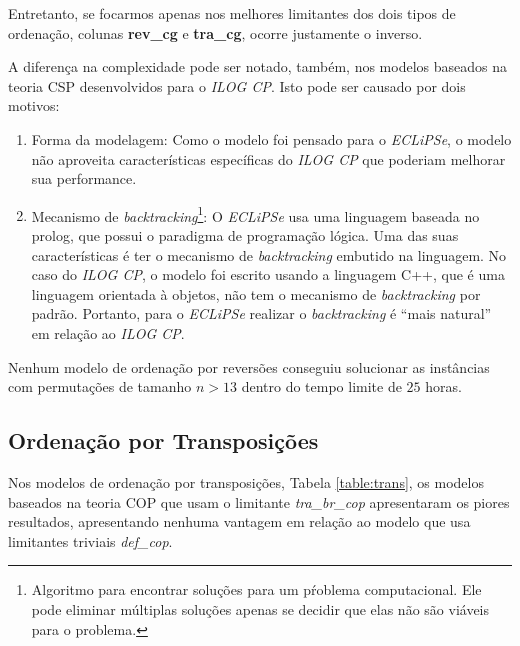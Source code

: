 Entretanto, se focarmos apenas nos melhores limitantes dos dois tipos
de ordenação, colunas \textbf{rev\_cg} e \textbf{tra\_cg}, ocorre
justamente o inverso. 



A diferença na complexidade pode ser notado, também, nos modelos
baseados na teoria CSP desenvolvidos para o \textit{ILOG CP}. Isto
pode ser causado por dois motivos:
\begin{enumerate}

  \item{Forma da modelagem: Como o modelo foi pensado para
  o \textit{ECLiPSe}, o modelo não aproveita características
  específicas do \textit{ILOG CP} que poderiam melhorar sua
  performance.}

  \item{Mecanismo de \textit{backtracking}\footnote{Algoritmo para
  encontrar soluções para um pŕoblema computacional. Ele pode eliminar
  múltiplas soluções apenas se decidir que elas não são viáveis para o
  problema.}: O \textit{ECLiPSe} usa uma linguagem baseada no prolog,
  que possui o paradigma de programação lógica. Uma das suas
  características é ter o mecanismo de \textit{backtracking} embutido
  na linguagem. No caso do \textit{ILOG CP}, o modelo foi escrito
  usando a linguagem C++, que é uma linguagem orientada à objetos, não
  tem o mecanismo de \textit{backtracking} por padrão. Portanto, para
  o \textit{ECLiPSe} realizar o \textit{backtracking} é ``mais
  natural'' em relação ao \textit{ILOG CP}.}

\end{enumerate}

Nenhum modelo de ordenação por reversões conseguiu solucionar as
instâncias com permutações de tamanho $n > 13$ dentro do tempo limite
de $25$ horas.



\subsection{Ordenação por Transposições}
\label{subsec:analise_tra}
Nos modelos de ordenação por transposições, Tabela \ref{table:trans},
os modelos baseados na teoria COP que usam o
limitante \textit{tra\_br\_cop} apresentaram os piores resultados,
apresentando nenhuma vantagem em relação ao modelo que usa limitantes
triviais \textit{def\_cop}.

